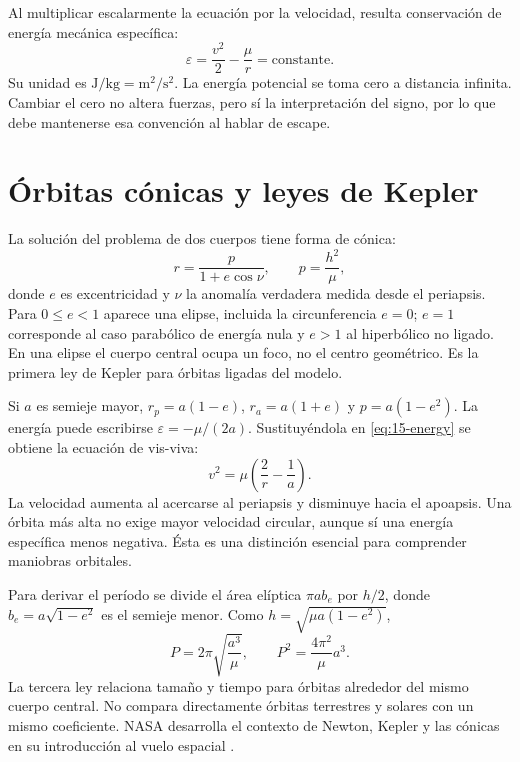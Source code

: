 Al multiplicar escalarmente la ecuación por la velocidad, resulta conservación de energía mecánica específica:
\begin{equation}\label{eq:15-energy}
\varepsilon=\frac{v^2}{2}-\frac\mu r=\mathrm{constante}.
\end{equation}
Su unidad es $\mathrm{J/kg}=\mathrm{m^2/s^2}$. La energía potencial se toma cero a distancia infinita. Cambiar el cero no altera fuerzas, pero sí la interpretación del signo, por lo que debe mantenerse esa convención al hablar de escape.

\section{Órbitas cónicas y leyes de Kepler}
La solución del problema de dos cuerpos tiene forma de cónica:
\begin{equation}
r=\frac{p}{1+e\cos\nu},\qquad p=\frac{h^2}{\mu},
\end{equation}
donde $e$ es excentricidad y $\nu$ la anomalía verdadera medida desde el periapsis. Para $0\leq e<1$ aparece una elipse, incluida la circunferencia $e=0$; $e=1$ corresponde al caso parabólico de energía nula y $e>1$ al hiperbólico no ligado. En una elipse el cuerpo central ocupa un foco, no el centro geométrico. Es la primera ley de Kepler para órbitas ligadas del modelo.

Si $a$ es semieje mayor, $r_p=a(1-e)$, $r_a=a(1+e)$ y $p=a(1-e^2)$. La energía puede escribirse $\varepsilon=-\mu/(2a)$. Sustituyéndola en \eqref{eq:15-energy} se obtiene la ecuación de vis-viva:
\begin{equation}\label{eq:15-visviva}
v^2=\mu\left(\frac2r-\frac1a\right).
\end{equation}
La velocidad aumenta al acercarse al periapsis y disminuye hacia el apoapsis. Una órbita más alta no exige mayor velocidad circular, aunque sí una energía específica menos negativa. Ésta es una distinción esencial para comprender maniobras orbitales.

Para derivar el período se divide el área elíptica $\pi a b_e$ por $h/2$, donde $b_e=a\sqrt{1-e^2}$ es el semieje menor. Como $h=\sqrt{\mu a(1-e^2)}$,
\begin{equation}\label{eq:15-kepler3}
P=2\pi\sqrt{\frac{a^3}{\mu}},\qquad
P^2=\frac{4\pi^2}{\mu}a^3.
\end{equation}
La tercera ley relaciona tamaño y tiempo para órbitas alrededor del mismo cuerpo central. No compara directamente órbitas terrestres y solares con un mismo coeficiente. NASA desarrolla el contexto de Newton, Kepler y las cónicas en su introducción al vuelo espacial \cite{NASA-ORBIT}.

